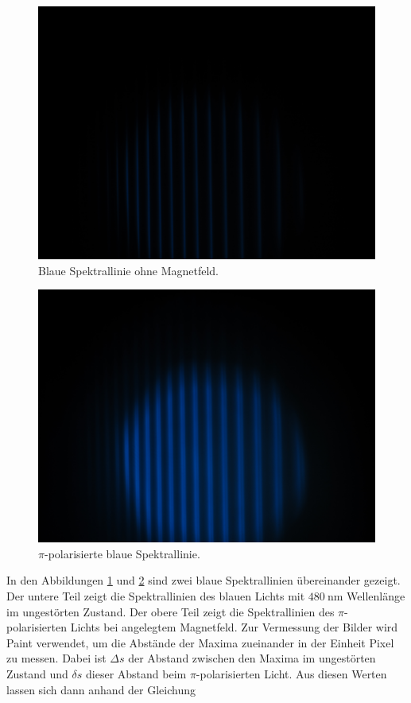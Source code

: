 \begin{figure}
    \centering
    \includegraphics[width=\textwidth]{fotos/blau_0.JPG}
    \caption{Blaue Spektrallinie ohne Magnetfeld.}
    \label{fig:blau_0}
\end{figure}
\hfill
\begin{figure}
    \centering
    \includegraphics[width=\textwidth]{fotos/blau_pi.JPG}
    \caption{$\pi$-polarisierte blaue Spektrallinie.}
    \label{fig:blau_pi}
\end{figure}
\FloatBarrier

In den Abbildungen \ref{fig:blau_0} und \ref{fig:blau_pi} sind zwei blaue Spektrallinien übereinander gezeigt. Der untere Teil zeigt die Spektrallinien des blauen Lichts mit 
$\SI{480}{\nano\metre}$ Wellenlänge im ungestörten Zustand. Der obere Teil zeigt die Spektrallinien des $\pi$-polarisierten Lichts bei 
angelegtem Magnetfeld. Zur Vermessung der Bilder wird Paint verwendet, um die Abstände der Maxima zueinander in der Einheit Pixel zu messen. 
Dabei ist $\Delta s$ der Abstand zwischen den Maxima im ungestörten Zustand und $\delta s$ dieser Abstand beim $\pi$-polarisierten Licht. 
Aus diesen Werten lassen sich dann anhand der Gleichung 

